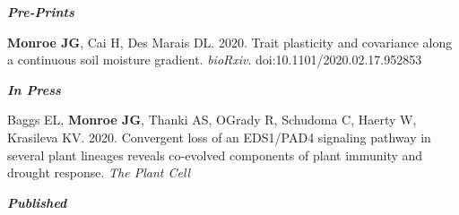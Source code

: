 \documentclass[12pt,english]{article}
\begin{document}
\begin{hangparas}{.5in}{1}

\textbf{\textit{Pre-Prints}}\par
\hspace{1em} \textbf{Monroe JG}, Cai H, Des Marais DL. 2020. Trait plasticity and covariance along a continuous soil moisture gradient. \textit{bioRxiv}. doi:10.1101/2020.02.17.952853

\textbf{\textit{In Press}}\par
\hspace{1em} Baggs EL, \textbf{Monroe JG}, Thanki AS, OGrady R, Schudoma C, Haerty W, Krasileva KV. 2020. Convergent loss of an EDS1/PAD4 signaling pathway in several plant lineages reveals co-evolved components of plant immunity and drought response. \textit{The Plant Cell}

\textbf{\textit{Published}}\par


\end{hangparas}
\end{document}
